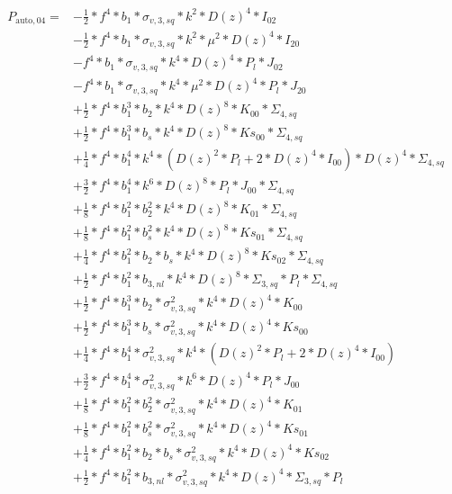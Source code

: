 \documentclass{article}
\begin{document}
\begin{equation}
\begin{aligned}  
P_{\mathrm{auto},04}=&-\frac{1}{2}*f^{4}*b_{1}*\sigma_{v,3,sq}*k^{2}*D(z)^{4}*I_{02} \\
&-\frac{1}{2}*f^{4}*b_{1}*\sigma_{v,3,sq}*k^{2}*\mu^{2}*D(z)^{4}*I_{20} \\
&-f^{4}*b_{1}*\sigma_{v,3,sq}*k^{4}*D(z)^{4}*P_l*J_{02} \\
&-f^{4}*b_{1}*\sigma_{v,3,sq}*k^{4}*\mu^{2}*D(z)^{4}*P_l*J_{20} \\
&+\frac{1}{2}*f^{4}*b_{1}^{3}*b_{2}*k^{4}*D(z)^{8}*K_{00}*\Sigma_{4,sq} \\
&+\frac{1}{2}*f^{4}*b_{1}^{3}*b_{s}*k^{4}*D(z)^{8}*Ks_{00}*\Sigma_{4,sq} \\
&+\frac{1}{4}*f^{4}*b_{1}^{4}*k^{4}*(D(z)^{2}*P_l + 2*D(z)^{4}*I_{00})*D(z)^{4}*\Sigma_{4,sq} \\
&+\frac{3}{2}*f^{4}*b_{1}^{4}*k^{6}*D(z)^{8}*P_l*J_{00}*\Sigma_{4,sq} \\
&+\frac{1}{8}*f^{4}*b_{1}^{2}*b_{2}^{2}*k^{4}*D(z)^{8}*K_{01}*\Sigma_{4,sq} \\
&+\frac{1}{8}*f^{4}*b_{1}^{2}*b_{s}^{2}*k^{4}*D(z)^{8}*Ks_{01}*\Sigma_{4,sq} \\
&+\frac{1}{4}*f^{4}*b_{1}^{2}*b_{2}*b_{s}*k^{4}*D(z)^{8}*Ks_{02}*\Sigma_{4,sq}\\
&+\frac{1}{2}*f^{4}*b_{1}^{2}*b_{3,nl}*k^{4}*D(z)^{8}*\Sigma_{3,sq}*P_l*\Sigma_{4,sq} \\
&+\frac{1}{2}*f^{4}*b_{1}^{3}*b_{2}*\sigma_{v,3,sq}^{2}*k^{4}*D(z)^{4}*K_{00} \\
&+\frac{1}{2}*f^{4}*b_{1}^{3}*b_{s}*\sigma_{v,3,sq}^{2}*k^{4}*D(z)^{4}*Ks_{00} \\
&+\frac{1}{4}*f^{4}*b_{1}^{4}*\sigma_{v,3,sq}^{2}*k^{4}*(D(z)^{2}*P_l + 2*D(z)^{4}*I_{00}) \\
&+\frac{3}{2}*f^{4}*b_{1}^{4}*\sigma_{v,3,sq}^{2}*k^{6}*D(z)^{4}*P_l*J_{00} \\
&+\frac{1}{8}*f^{4}*b_{1}^{2}*b_{2}^{2}*\sigma_{v,3,sq}^{2}*k^{4}*D(z)^{4}*K_{01}\\
&+\frac{1}{8}*f^{4}*b_{1}^{2}*b_{s}^{2}*\sigma_{v,3,sq}^{2}*k^{4}*D(z)^{4}*Ks_{01}\\
&+\frac{1}{4}*f^{4}*b_{1}^{2}*b_{2}*b_{s}*\sigma_{v,3,sq}^{2}*k^{4}*D(z)^{4}*Ks_{02}\\
&+\frac{1}{2}*f^{4}*b_{1}^{2}*b_{3,nl}*\sigma_{v,3,sq}^{2}*k^{4}*D(z)^{4}*\Sigma_{3,sq}*P_l
\end{aligned}
\end{equation}
\end{document}
